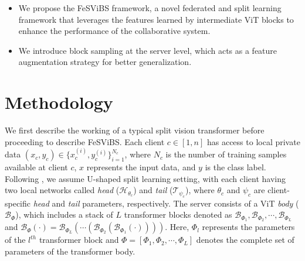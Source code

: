 \documentclass[runningheads]{llncs}
\begin{document}
\begin{itemize}
    \item [i.] We propose the FeSViBS framework, a novel federated and split learning framework that leverages the features learned by intermediate ViT blocks to enhance the performance of the collaborative system. 
    \item [ii.] We introduce block sampling at the server level, which acts as a feature augmentation strategy for better generalization. 
\end{itemize}

\section{Methodology}
We first describe the working of a typical split vision transformer before proceeding to describe FeSViBS. Each client $c \in [1,n]$ has access to local private data $(x_c, y_c) \in \{x_c^{(i)},y_c^{(i)}\}_{i=1}^{N_c}$, where $N_c$ is the number of training samples available at client $c$, $x$ represents the input data, and $y$ is the class label. Following \cite{visonVits}, we assume U-shaped split learning setting, with each client having two local networks called \emph{head} ($\mathbf{\mathcal{H}}_{\theta_c}$) and \emph{tail} ($\mathbf{\mathcal{T}}_{\psi_c}$), where %
$\theta_c$ and $\psi_c$ are client-specific \emph{head} and \emph{tail} parameters, respectively. The server consists of a ViT \emph{body} ($\mathbf{\mathcal{B}}_\Phi$), which includes a stack of $L$ transformer blocks denoted as $\mathbf{\mathcal{B}}_{\Phi_1}, \mathbf{\mathcal{B}}_{\Phi_2}, \cdots, \mathbf{\mathcal{B}}_{\Phi_L}$ and $\mathbf{\mathcal{B}}_\Phi(\cdot) = \mathbf{\mathcal{B}}_{\Phi_L}(\cdots(\mathbf{\mathcal{B}}_{\Phi_2}(\mathbf{\mathcal{B}}_{\Phi_1}(\cdot))))$. Here, $\Phi_l$ represents the parameters of the $l^{th}$ transformer block and $\Phi = \left[\Phi_1,\Phi_2,\cdots,\Phi_L\right]$ denotes the complete set of parameters of the transformer body.
\end{document}
